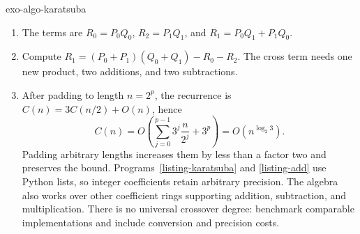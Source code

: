 \begin{correction}{exo-algo-karatsuba}
\begin{enumerate}
\item The terms are $R_0=P_0Q_0$, $R_2=P_1Q_1$, and
$R_1=P_0Q_1+P_1Q_0$.
\item Compute
$R_1=(P_0+P_1)(Q_0+Q_1)-R_0-R_2$.
The cross term needs one new product, two additions, and two subtractions.
\item After padding to length $n=2^p$, the recurrence is
$C(n)=3C(n/2)+O(n)$, hence
\[
 C(n)=O\!\left(\sum_{j=0}^{p-1}3^j\frac n{2^j}+3^p\right)
     =O(n^{\log_2 3}).
\]
Padding arbitrary lengths increases them by less than a factor two and
preserves the bound. Programs~\ref{listing-karatsuba} and \ref{listing-add}
use Python lists, so integer coefficients retain arbitrary precision.
The algebra also works over other coefficient rings supporting addition,
subtraction, and multiplication. There is no universal crossover degree:
benchmark comparable implementations and include conversion and precision costs.
\begin{listing}[H]
\caption{Karatsuba multiplication with exact Python integer coefficients.}
\label{listing-karatsuba}
\end{listing}
\begin{listing}[H]
\caption{Addition of coefficient vectors of different lengths.}
\label{listing-add}
\end{listing}
\end{enumerate}
\end{correction}

